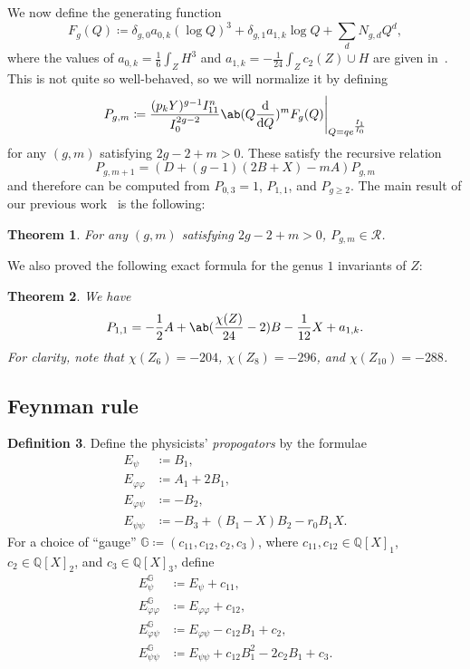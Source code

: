 \documentclass[10pt]{amsart}
\newtheorem{thm}{Theorem}[section]
\theoremstyle{definition}
\newtheorem{defn}[thm]{Definition}
\theoremstyle{remark}
\theoremstyle{plain}
\theoremstyle{definition}
\theoremstyle{remark}
\newcommand{\G}{\mathbb{G}}
\newcommand{\Q}{\mathbb{Q}}
\newcommand{\msc}[1]{\mathscr{#1}}
\newcommand{\1}{\mathbf{1}}
\newcommand{\2}{\mathbf{2}}
\newcommand{\3}{\mathbf{3}}
\numberwithin{equation}{section}
\begin{document}
We now define the generating function
\[ F_g(Q) \coloneqq \delta_{g,0} a_{0,k} (\log Q)^3 + \delta_{g,1} a_{1,k} \log Q + \sum_d N_{g,d} Q^d, \]
where the values of $a_{0,k} = \frac{1}{6} \int_Z H^3$ and $a_{1,k} = -\frac{1}{24} \int_Z c_2(Z) \cup H$ are given in~.
This is not quite so well-behaved, so we will normalize it by defining
\[ P_{g,m} \coloneqq \frac{(p_k Y)^{g-1} I_{11}^n}{I_0^{2g-2}} \ab(Q \odv{}{Q})^m F_g(Q) \Bigg|_{Q = qe^{\frac{I_1}{I_0}}} \]
for any $(g,m)$ satisfying $2g-2+m > 0$. These satisfy the recursive relation
\[ P_{g,m+1} = (D+(g-1)(2B+X)-mA)P_{g,m} \]
and therefore can be computed from $P_{0,3} = 1$, $P_{1,1}$, and $P_{g \geq 2}$.
The main result of our previous work~\cite{polynomiality} is the following:
\begin{thm}
    For any $(g,m)$ satisfying $2g-2+m > 0$, $P_{g,m} \in \msc{R}$.
\end{thm}

We also proved the following exact formula for the genus $1$ invariants of $Z$:
\begin{thm}
    We have
    \[ P_{1,1} = -\frac{1}{2}A + \ab(\frac{\chi(Z)}{24} - 2) B - \frac{1}{12}X + a_{1,k}. \]
    For clarity, note that $\chi(Z_6) = -204$, $\chi(Z_8) = -296$, and $\chi(Z_{10}) = -288$.
\end{thm}

\subsection{Feynman rule}%
\label{sub:Feynman rule}

\begin{defn}\label{defn:propogators}
    Define the physicists' \textit{propogators} by the formulae
    \begin{align*}
        E_{\psi} &\coloneqq B_1, \\
        E_{\varphi\varphi} &\coloneqq A_1 + 2 B_1, \\
        E_{\varphi\psi} &\coloneqq -B_2, \\
        E_{\psi\psi} &\coloneqq -B_3 + (B_1 - X)B_2 - r_0 B_1 X.
    \end{align*}
    For a choice of ``gauge'' $\G \coloneqq (c_{11}, c_{12}, c_2, c_3)$, where $c_{11},c_{12} \in \Q[X]_{1}$, $c_2 \in \Q[X]_{2}$, and $c_3 \in \Q[X]_{3}$, define
    \begin{align*}
        E_{\psi}^{\G} &\coloneqq E_{\psi} + c_{11}, \\
        E_{\varphi\varphi}^{\G} &\coloneqq E_{\varphi\varphi} + c_{12}, \\
        E_{\varphi\psi}^{\G} &\coloneqq E_{\varphi\psi} - c_{12}B_1 + c_2, \\
        E_{\psi\psi}^{\G} &\coloneqq E_{\psi\psi} + c_{12} B_1^2 - 2 c_2 B_1 + c_3.
    \end{align*}
\end{defn}
\end{document}
